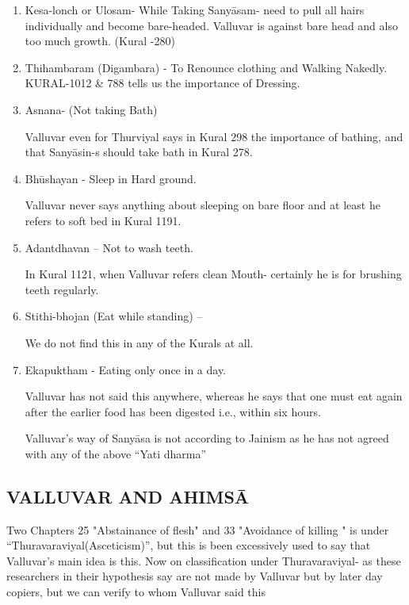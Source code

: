 \begin{enumerate}[{\rm 1)}]
\itemsep=0pt
\item Kesa-lonch or Ulosam- While Taking Sanyāsam- need to pull all hairs individually and become bare-headed. Valluvar is against bare head and also too much growth. (Kural -280)
 
 \item Thihambaram (Digambara) - To Renounce clothing and Walking Nakedly. KURAL-1012 \& 788 tells us the importance of Dressing.
 
 \item 
 Asnana- (Not taking Bath)

 Valluvar even for Thurviyal says in Kural 298 the importance of bathing, and that Sanyāsin-s should take bath in Kural 278.

 \item 
 Bhūshayan - Sleep in Hard ground.

 Valluvar never says anything about sleeping on bare floor and at least he refers to soft bed in Kural 1191.

 \item 
 Adantdhavan – Not to wash teeth.

 In Kural 1121, when Valluvar refers clean Mouth- certainly he is for brushing teeth regularly.

 \item 
 Stithi-bhojan (Eat while standing) –

 We do not find this in any of the Kurals at all.

 \item 
 Ekapuktham - Eating only once in a day.

 Valluvar has not said this anywhere, whereas he says that one must eat again after the earlier food has been digested i.e., within six hours.

 Valluvar’s way of Sanyāsa is not according to Jainism as he has not agreed with any of the above “Yati dharma”

\end{enumerate}


\subsection*{VALLUVAR AND AHIMSĀ}

Two Chapters 25 "Abstainance of flesh" and 33 "Avoidance of killing " is under “Thuravaraviyal(Asceticism)”, but this is been excessively used to say that Valluvar’s main idea is this. Now on classification under Thuravaraviyal- as these researchers in their hypothesis say are not made by Valluvar but by later day copiers, but we can verify to whom Valluvar said this

